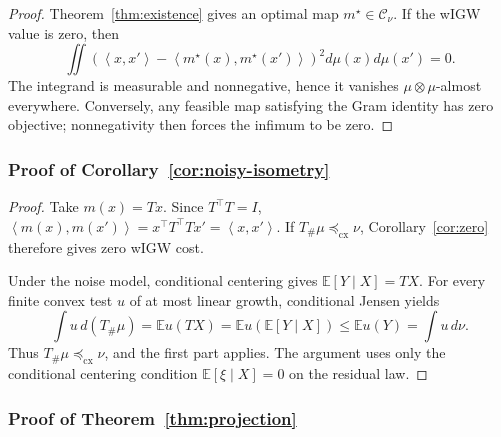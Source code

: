 \documentclass[11pt]{article}
\newcommand{\E}{\mathbb E}
\newcommand{\ip}[2]{\left\langle #1,#2\right\rangle}
\newcommand{\cx}{\preceq_{\mathrm{cx}}}
\theoremstyle{plain}
\theoremstyle{definition}
\theoremstyle{remark}
\begin{document}
\begin{proof}
Theorem~\ref{thm:existence} gives an optimal map $m^\star\in\mathcal C_\nu$.
If the wIGW value is zero, then
\[
 \iint(\ip{x}{x'}-\ip{m^\star(x)}{m^\star(x')})^2d\mu(x)d\mu(x')=0.
\]
The integrand is measurable and nonnegative, hence it vanishes
$\mu\otimes\mu$-almost everywhere.  Conversely, any feasible map satisfying the
Gram identity has zero objective; nonnegativity then forces the infimum to be zero.
\end{proof}

\subsubsection{Proof of Corollary~\ref{cor:noisy-isometry}}\label{proof:5.3}

\begin{proof}
Take $m(x)=Tx$.  Since $T^\top T=I$,
$\ip{m(x)}{m(x')}=x^\top T^\top Tx'=\ip{x}{x'}$.  If $T_\#\mu\cx\nu$,
Corollary~\ref{cor:zero} therefore gives zero wIGW cost.

Under the noise model, conditional centering gives $\E[Y\mid X]=TX$.  For every
finite convex test $u$ of at most linear growth, conditional Jensen yields
\[
 \int u\,d(T_\#\mu)=\E u(TX)
 =\E u(\E[Y\mid X])\le\E u(Y)=\int u\,d\nu.
\]
Thus $T_\#\mu\cx\nu$, and the first part applies.  The argument uses only the
conditional centering condition $\E[\xi\mid X]=0$ on the residual law.
\end{proof}

\subsubsection{Proof of Theorem~\ref{thm:projection}}\label{proof:6.1}
\end{document}
